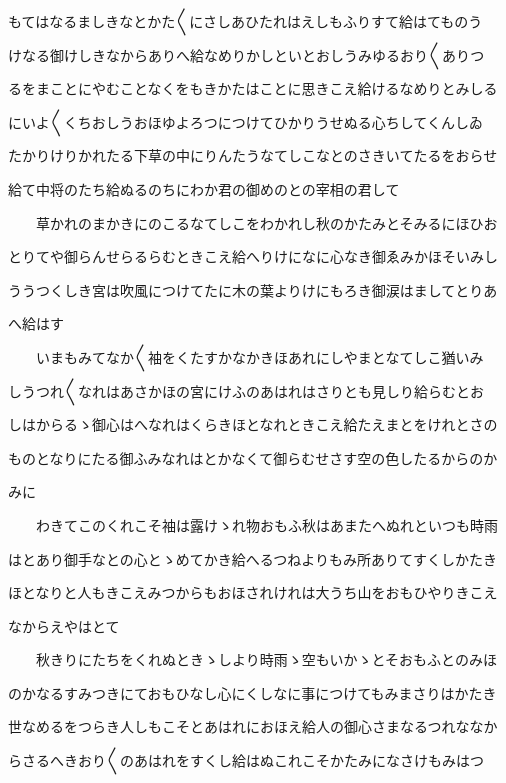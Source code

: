 \documentclass[a4paper,11pt,landscape]{ltjtarticle}
\begin{document}
\par\medskip
もてはなるましきなとかた〱にさしあひたれはえしもふりすて給はてものう
\par\medskip
けなる御けしきなからありへ給なめりかしといとおしうみゆるおり〱ありつ
\par\medskip
るをまことにやむことなくをもきかたはことに思きこえ給けるなめりとみしる
\par\medskip
にいよ〱くちおしうおほゆよろつにつけてひかりうせぬる心ちしてくんしゐ
\par\medskip
たかりけりかれたる下草の中にりんたうなてしこなとのさきいてたるをおらせ
\par\medskip
給て中将のたち給ぬるのちにわか君の御めのとの宰相の君して
\par\medskip
　　草かれのまかきにのこるなてしこをわかれし秋のかたみとそみるにほひお
\par\medskip
とりてや御らんせらるらむときこえ給へりけになに心なき御ゑみかほそいみし
\par\medskip
ううつくしき宮は吹風につけてたに木の葉よりけにもろき御涙はましてとりあ
\par\medskip
へ給はす
\par\medskip
　　いまもみてなか〱袖をくたすかなかきほあれにしやまとなてしこ猶いみ
\par\medskip
しうつれ〱なれはあさかほの宮にけふのあはれはさりとも見しり給らむとお
\par\medskip
しはからるゝ御心はへなれはくらきほとなれときこえ給たえまとをけれとさの
\par\medskip
ものとなりにたる御ふみなれはとかなくて御らむせさす空の色したるからのか
\par\medskip
みに
\par\medskip
　　わきてこのくれこそ袖は露けゝれ物おもふ秋はあまたへぬれといつも時雨
\par\medskip
はとあり御手なとの心とゝめてかき給へるつねよりもみ所ありてすくしかたき
\par\medskip
ほとなりと人もきこえみつからもおほされけれは大うち山をおもひやりきこえ
\par\medskip
なからえやはとて
\par\medskip
　　秋きりにたちをくれぬときゝしより時雨ゝ空もいかゝとそおもふとのみほ
\par\medskip
のかなるすみつきにておもひなし心にくしなに事につけてもみまさりはかたき
\par\medskip
世なめるをつらき人しもこそとあはれにおほえ給人の御心さまなるつれななか
\par\medskip
らさるへきおり〱のあはれをすくし給はぬこれこそかたみになさけもみはつ
\end{document}
